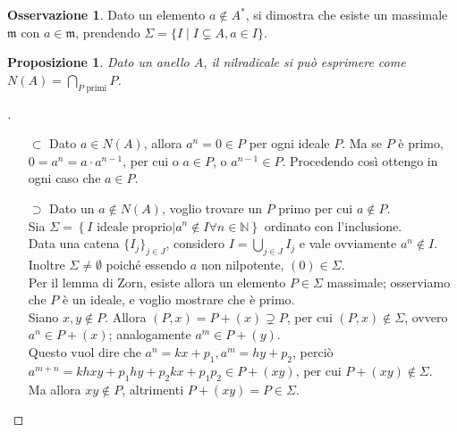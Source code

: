 \documentclass[a4paper,10pt]{article}
\theoremstyle{plain}
\newtheorem{prop}[thm]{Proposizione}
\theoremstyle{definition}
\newtheorem*{oss}{Osservazione}
\newenvironment{myproof}[1][\proofname]{%
  \begin{proof}[#1]$ $\par\nobreak\ignorespaces
}{%
  \qedhere
  \end{proof}
}
\newcommand{\m}{\mathfrak{m}}
\newcommand{\N}{\mathbb{N}}
\begin{document}
\begin{oss}
    Dato un elemento $a\not\in A^\ast$, si dimostra che esiste un massimale $\m$ con $a\in\m$, prendendo $\Sigma=\{ I \mid I\subsetneq A,a\in I\}$.
\end{oss}

\begin{prop}
    Dato un anello $A$, il nilradicale si può esprimere come $\displaystyle N(A)=\bigcap_{P\text{ primi}}P$.
\end{prop}
\begin{myproof}
    \begin{itemize}
        \item[$\subset$] Dato $a\in N(A)$, allora $a^n=0\in P$ per ogni ideale $P$. Ma se $P$ è primo, $0=a^n=a\cdot a^{n-1}$, per cui o $a\in P$, o $a^{n-1}\in P$. Procedendo così ottengo in ogni caso che $a\in P$.
        \item[$\supset$] Dato un $a\not\in N(A)$, voglio trovare un $P$ primo per cui $a\not\in P$.\\
        Sia $\Sigma=\left\{ I \text{ ideale proprio} | a^n\not\in I\forall n\in\N \right\}$ ordinato con l'inclusione.\\
        Data una catena $\{I_j\}_{j\in J}$, considero $I=\bigcup_{j\in J}I_j$ e vale ovviamente $a^n\not\in I$. Inoltre $\Sigma\neq\emptyset$ poiché essendo $a$ non nilpotente, $(0)\in\Sigma$.\\
        Per il lemma di Zorn, esiste allora un elemento $P\in\Sigma$ massimale; osserviamo che $P$ è un ideale, e voglio mostrare che è primo.\\
        Siano $x,y\not\in P$. Allora $(P,x)=P+(x)\supsetneq P$, per cui $(P,x)\not\in\Sigma$, ovvero $a^n\in P+(x)$; analogamente $a^m\in P+(y)$.\\
        Questo vuol dire che $a^n=kx+p_1,a^m=hy+p_2$, perciò $a^{m+n}=khxy+p_1hy+p_2kx+p_1p_2\in P+(xy)$, per cui $P+(xy)\not\in\Sigma$.\\
        Ma allora $xy\not\in P$, altrimenti $P+(xy)=P\in\Sigma$.
    \end{itemize}
\end{myproof}
\end{document}
